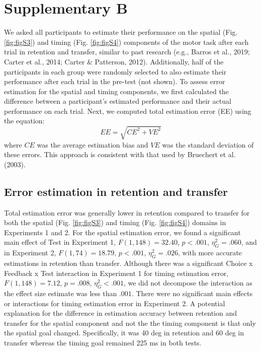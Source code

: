 \documentclass[
  doc, donotrepeattitle,floatsintext]{apa7}
\begin{document}
\clearpage

\hypertarget{supplementary-b}{%
\section{Supplementary B}\label{supplementary-b}}

We asked all participants to estimate their performance on the spatial (Fig. \ref{fig:figS3}) and timing (Fig. \ref{fig:figS4}) components of the motor task after each trial in retention and transfer, similar to past research (e.g., Barros et al., 2019; Carter et al., 2014; Carter \& Patterson, 2012). Additionally, half of the participants in each group were randomly selected to also estimate their performance after each trial in the pre-test (not shown). To assess error estimation for the spatial and timing components, we first calculated the difference between a participant's estimated performance and their actual performance on each trial. Next, we computed total estimation error (EE) using the equation:
\begin{equation}
EE = \sqrt{CE^2 + VE^2}
\end{equation}
where \(CE\) was the average estimation bias and \(VE\) was the standard deviation of these errors. This approach is consistent with that used by Bruechert et al. (2003).

\hypertarget{error-estimation-in-retention-and-transfer}{%
\subsection{Error estimation in retention and transfer}\label{error-estimation-in-retention-and-transfer}}

Total estimation error was generally lower in retention compared to transfer for both the spatial (Fig. \ref{fig:figS3}) and timing (Fig. \ref{fig:figS4}) domains in Experiments 1 and 2. For the spatial estimation error, we found a significant main effect of Test in Experiment 1, \(F(1,148) = 32.40\), \(p < .001\), \(\eta_{G}^2 = .060\), and in Experiment 2, \(F(1,74) = 18.79\), \(p < .001\), \(\eta_{G}^2 = .026\), with more accurate estimations in retention than transfer. Although there was a significant Choice x Feedback x Test interaction in Experiment 1 for timing estimation error, \(F(1,148) = 7.12\), \(p = .008\), \(\eta_{G}^2 < .001\), we did not decompose the interaction as the effect size estimate was less than \(.001\). There were no significant main effects or interactions for timing estimation error in Experiment 2. A potential explanation for the difference in estimation accuracy between retention and transfer for the spatial component and not the the timing component is that only the spatial goal changed. Specifically, it was 40 deg in retention and 60 deg in transfer whereas the timing goal remained 225 ms in both tests.
\end{document}
